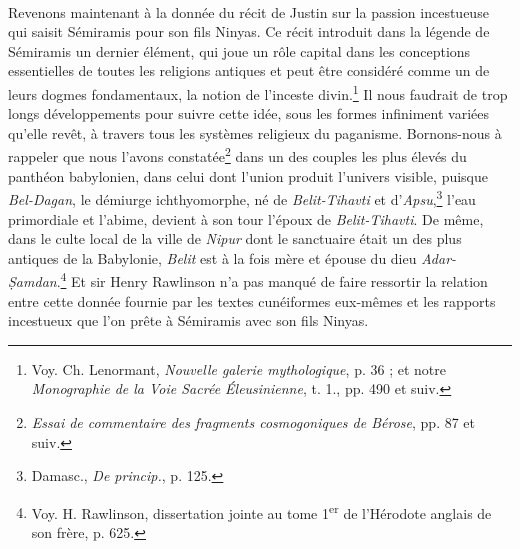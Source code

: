 \documentclass[a4paper, 11pt, oneside]{article}
\begin{document}
\paragraph{}
Revenons maintenant à la donnée du récit de Justin sur la passion incestueuse qui saisit Sémiramis pour son fils Ninyas. Ce récit introduit dans la légende de Sémiramis un dernier élément, qui joue un rôle capital dans les conceptions essentielles de toutes les religions antiques et peut être considéré comme un de leurs dogmes fondamentaux, la notion de l'inceste divin.\footnote{Voy. Ch. Lenormant, \emph{Nouvelle galerie mythologique}, p. 36 ; et notre \emph{Monographie de la Voie Sacrée Éleusinienne}, t. 1., pp. 490 et suiv.} Il nous faudrait de trop longs développements pour suivre cette idée, sous les formes infiniment variées qu'elle revêt, à travers tous les systèmes religieux du paganisme. Bornons-nous à rappeler que nous l'avons constatée\footnote{\emph{Essai de commentaire des fragments cosmogoniques de Bérose}, pp. 87 et suiv.} dans un des couples les plus élevés du panthéon babylonien, dans celui dont l'union produit l'univers visible, puisque \emph{Bel-Dagan}, le démiurge ichthyomorphe, né de \emph{Belit-Tihavti} et d'\emph{Apsu},\footnote{Damasc., \emph{De princip.}, p. 125.} l'eau primordiale et l'abime, devient à son tour l'époux de \emph{Belit-Tihavti}. De même, dans le culte local de la ville de \emph{Nipur} dont le sanctuaire était un des plus antiques de la Babylonie, \emph{Belit} est à la fois mère et épouse du dieu \emph{Adar-\d{S}amdan}.\footnote{Voy. H. Rawlinson, dissertation jointe au tome 1\textsuperscript{er} de l'Hérodote anglais de son frère, p. 625.} Et sir Henry Rawlinson n'a pas manqué de faire ressortir la relation entre cette donnée fournie par les textes cunéiformes eux-mêmes et les rapports incestueux que l'on prête à Sémiramis avec son fils Ninyas.
\end{document}
